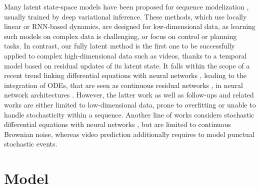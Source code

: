 \documentclass{article}
\begin{document}
Many latent state-space models have been proposed for sequence modelization \citep{Bayer2014, Fraccaro2016, Fraccaro2017, Krishnan2017, Karl2017, Hafner2019}, usually trained by deep variational inference.
These methods, which use locally linear or RNN-based dynamics, are designed for low-dimensional data, as learning such models on complex data is challenging, or focus on control or planning tasks.
In contrast, our fully latent method is the first one to be successfully applied to complex high-dimensional data such as videos, thanks to a temporal model based on residual updates of its latent state.
It falls within the scope of a recent trend linking differential equations with neural networks \citep{Lu2017b, Long2018}, leading to the integration of ODEs, that are seen as continuous residual networks \citep{He2016}, in neural network architectures \citep{Chen2018}.
However, the latter work as well as follow-ups and related works \citep{Rubanova2019, Yildiz2019, LeGuen2020} are either limited to low-dimensional data, prone to overfitting or unable to handle stochasticity within a sequence.
Another line of works considers stochastic differential equations with neural networks \citep{Ryder2018, DeBrouwer2019}, but are limited to continuous Brownian noise, whereas video prediction additionally requires to model punctual stochastic events.
 
\section{Model}
\label{sec:Model}
\end{document}
